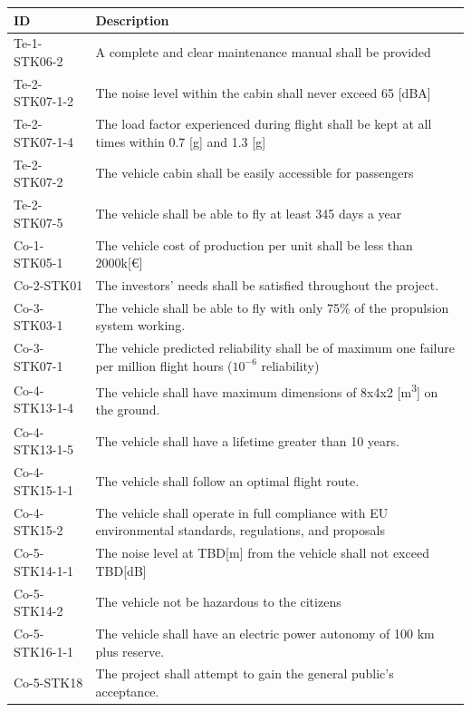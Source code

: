 \begin{table}[ht]
{\begin{tabular}{l|l}
\textbf{ID}    & \textbf{Description}                                                               \\ \midrule
Te-1-STK06-2 &  A complete and clear maintenance manual shall be provided             \\
Te-2-STK07-1-2 & The noise level within the cabin shall never exceed 65 {[}dBA{]}                      \\
Te-2-STK07-1-4 & The load factor experienced during flight shall be kept at all times within 0.7 {[}g{]} and 1.3 {[}g{]} \\
Te-2-STK07-2   & The vehicle cabin shall be easily accessible for passengers                            \\
Te-2-STK07-5   & The vehicle shall be able to fly at least 345 days a year                              \\
Co-1-STK05-1   & The vehicle cost of production per unit shall be less than 2000k{[}€{]}                \\
Co-2-STK01     & The investors’ needs shall be satisfied throughout the project.                        \\
Co-3-STK03-1   & The vehicle shall be able to fly with only 75\% of the propulsion system working.      \\
Co-3-STK07-1    & The vehicle predicted reliability shall be of maximum one failure per million flight hours ($\text{10}^{-6}$ reliability)    \\
Co-4-STK13-1-4 & The vehicle shall have maximum dimensions of 8x4x2 {[}\unit{m^3}{]} on the ground.             \\
Co-4-STK13-1-5 & The vehicle shall have a lifetime greater than 10 years.                           \\
Co-4-STK15-1-1 & The vehicle shall follow an optimal flight route. \\
Co-4-STK15-2   & The vehicle shall operate in full compliance with EU environmental standards,
regulations, and proposals \\
Co-5-STK14-1-1 & The noise level at TBD{[}m{]} from the vehicle shall not exceed TBD{[}dB{]}                         \\
Co-5-STK14-2   & The vehicle not be hazardous to the citizens                                    \\
Co-5-STK16-1-1 & The vehicle shall have an electric power autonomy of 100 km plus reserve. \\
Co-5-STK18     & The project shall attempt to gain the general public’s acceptance. 
                      \\   \bottomrule
\end{tabular}
}

\end{table}

